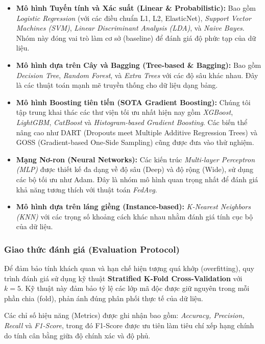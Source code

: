 \begin{itemize}
    \item \textbf{Mô hình Tuyến tính và Xác suất (Linear \& Probabilistic):} Bao gồm \textit{Logistic Regression} (với các điều chuẩn L1, L2, ElasticNet), \textit{Support Vector Machines (SVM)}, \textit{Linear Discriminant Analysis (LDA)}, và \textit{Naive Bayes}. Nhóm này đóng vai trò làm cơ sở (baseline) để đánh giá độ phức tạp của dữ liệu.
    
    \item \textbf{Mô hình dựa trên Cây và Bagging (Tree-based \& Bagging):} Bao gồm \textit{Decision Tree}, \textit{Random Forest}, và \textit{Extra Trees} với các độ sâu khác nhau. Đây là các thuật toán mạnh mẽ truyền thống cho dữ liệu dạng bảng.
    
    \item \textbf{Mô hình Boosting tiên tiến (SOTA Gradient Boosting):} Chúng tôi tập trung khai thác các thư viện tối ưu nhất hiện nay gồm \textit{XGBoost}, \textit{LightGBM}, \textit{CatBoost} và \textit{Histogram-based Gradient Boosting}. Các biến thể nâng cao như DART (Dropouts meet Multiple Additive Regression Trees) và GOSS (Gradient-based One-Side Sampling) cũng được đưa vào thử nghiệm.
    
    \item \textbf{Mạng Nơ-ron (Neural Networks):} Các kiến trúc \textit{Multi-layer Perceptron (MLP)} được thiết kế đa dạng về độ sâu (Deep) và độ rộng (Wide), sử dụng các bộ tối ưu như Adam. Đây là nhóm mô hình quan trọng nhất để đánh giá khả năng tương thích với thuật toán \textit{FedAvg}.
    
    \item \textbf{Mô hình dựa trên láng giềng (Instance-based):} \textit{K-Nearest Neighbors (KNN)} với các trọng số khoảng cách khác nhau nhằm đánh giá tính cục bộ của dữ liệu.
\end{itemize}

\subsubsection{Giao thức đánh giá (Evaluation Protocol)}
Để đảm bảo tính khách quan và hạn chế hiện tượng quá khớp (overfitting), quy trình đánh giá sử dụng kỹ thuật \textbf{Stratified K-Fold Cross-Validation} với $k=5$. Kỹ thuật này đảm bảo tỷ lệ các lớp mã độc được giữ nguyên trong mỗi phần chia (fold), phản ánh đúng phân phối thực tế của dữ liệu.

Các chỉ số hiệu năng (Metrics) được ghi nhận bao gồm: \textit{Accuracy, Precision, Recall} và \textit{F1-Score}, trong đó F1-Score được ưu tiên làm tiêu chí xếp hạng chính do tính cân bằng giữa độ chính xác và độ phủ.

